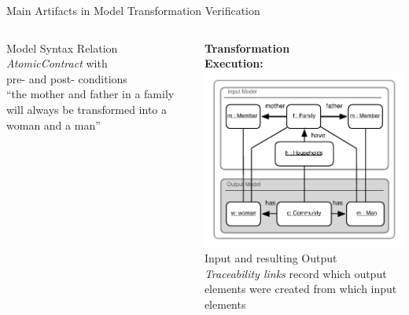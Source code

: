 \documentclass[final,hyperref={pdfpagelabels=false}]{beamer}
\begin{document}
\begin{frame}{}
\begin{columns}[t]
\begin{column}{.71\linewidth}
\begin{block}{Main Artifacts in Model Transformation Verification}
\begin{columns}[c]
\begin{column}{.24\linewidth}
\begin{center}
            \small{Model Syntax Relation\\ \emph{AtomicContract} with\\pre- and post- conditions} \\\vspace{1cm}\footnotesize{``the mother and father in a family will always be transformed into a woman
            and a man''} 
            \end{center}
            \end{column} 
            \vrule{} 
        \begin{column}{.24\linewidth}
        \begin{center} 
          \vspace{-1.5cm}\textbf{Transformation\\ Execution:}\vspace{0.5cm}
          \includegraphics[width=.99\textwidth]{../figures/presentation/artifacts/trans_ex}\\
          \vspace{0.5cm}\small{Input and resulting Output}\\\vspace{1.2cm}\footnotesize{\textit{Traceability links} record which output elements were created from which input elements}
          \end{center} 
          \end{column} 
              \end{columns} 
        \end{block}
        \end{column}


\end{columns}
\end{frame}
\end{document}

